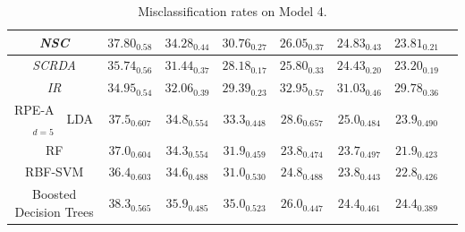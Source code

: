 \documentclass{amsart}
\providecommand{\tabularnewline}{\\}
\begin{document}
\begin{table}[p]
\begin{centering}
\begin{tabular}{r|l|c|c|c|c|c|c|c}
			\hline 
			\multicolumn{2}{c|}{\emph{NSC}} & $\mathit{37.80_{0.58}}$ & $\mathit{34.28_{0.44}}$ & $\mathit{30.76_{0.27}}$ & $\mathit{26.05_{0.37}}$ & $\mathit{24.83_{0.43}}$ & $\mathit{23.81_{0.21}}$ & \tabularnewline
			\hline 
			\multicolumn{2}{c|}{\emph{SCRDA}} & $\mathit{35.74_{0.56}}$ & $\mathit{31.44_{0.37}}$ & $\mathit{28.18_{0.17}}$ & $\mathit{25.80_{0.33}}$ & $\mathit{24.43_{0.20}}$ & $\mathit{23.20_{0.19}}$ & \tabularnewline
			\hline 
			\multicolumn{2}{c|}{\emph{IR}} & $\mathit{34.95_{0.54}}$ & $\mathit{32.06_{0.39}}$ & $\mathit{29.39_{0.23}}$ & $\mathit{32.95_{0.57}}$ & $\mathit{31.03_{0.46}}$ & $\mathit{29.78_{0.36}}$ & \tabularnewline
			\hline 
			\hline 
			RPE-A$_{d=5}$ & LDA & $37.5_{0.607}$ & $34.8_{0.554}$ & $33.3_{0.448}$ & $28.6_{0.657}$ & $25.0_{0.484}$ & $23.9_{0.490}$ & \tabularnewline
			\hline 
			\hline 
			\multicolumn{2}{c|}{RF} & $37.0_{0.604}$ & $34.3_{0.554}$ & $31.9_{0.459}$ & $\mathbf{23.8_{0.474}}$ & $\mathbf{23.7_{0.497}}$ & $\mathbf{21.9_{0.423}}$ & \tabularnewline
			\hline 
			\multicolumn{2}{c|}{RBF-SVM} & $36.4_{0.603}$ & $34.6_{0.488}$ & $31.0_{0.530}$ & $24.8_{0.488}$ & $23.8_{0.443}$ & $22.8_{0.426}$ & \tabularnewline
			\hline 
			\multicolumn{2}{c|}{Boosted Decision Trees} & $38.3_{0.565}$ & $35.9_{0.485}$ & $35.0_{0.523}$ & $26.0_{0.447}$ & $24.4_{0.461}$ & $24.4_{0.389}$ & \tabularnewline
		\end{tabular}\\
		
		\par\end{centering}
	
	\protect\caption{Misclassification rates on Model 4.}
	\label{tab:model-4}
\end{table}
\end{document}
